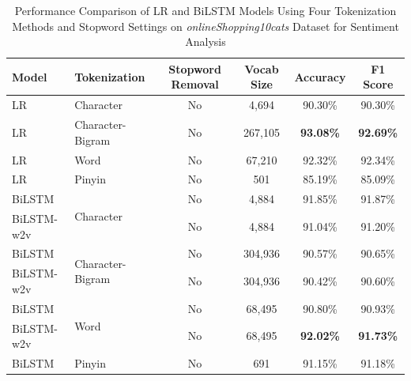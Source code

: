 \begin{table}[ht]
\centering
\begin{tabular}{l l c c c c}
\hline
\textbf{Model} & \textbf{Tokenization} & \textbf{Stopword Removal} & \textbf{Vocab Size} & \textbf{Accuracy} & \textbf{F1 Score} \\ 
\hline
\hline
LR & Character & No & 4,694 & 90.30\% & 90.30\% \\
LR & Character-Bigram & No & 267,105 & \textbf{93.08\%} & \textbf{92.69\%} \\
LR & Word & No & 67,210 & 92.32\% & 92.34\% \\
LR & Pinyin & No & 501 & 85.19\% & 85.09\% \\
\hline
\hline
BiLSTM & \multirow{2}{*}{Character} & No & 4,884 & 91.85\% & 91.87\% \\
BiLSTM-w2v &  & No & 4,884 & 91.04\% & 91.20\% \\
\hline
BiLSTM & \multirow{2}{*}{Character-Bigram} & No & 304,936 & 90.57\% & 90.65\% \\
BiLSTM-w2v & & No & 304,936 & 90.42\% & 90.60\% \\
\hline
BiLSTM & \multirow{2}{*}{Word} & No & 68,495 & 90.80\% & 90.93\% \\
BiLSTM-w2v & & No & 68,495 & \textbf{92.02\%} & \textbf{91.73\%} \\
\hline
BiLSTM & Pinyin & No & 691 & 91.15\% & 91.18\% \\
\hline
\end{tabular}
\caption{Performance Comparison of LR and BiLSTM Models Using Four Tokenization Methods and Stopword Settings on \textit{onlineShopping10cats} Dataset for Sentiment Analysis}
\label{table:model_performance_sentiment}
\end{table}


